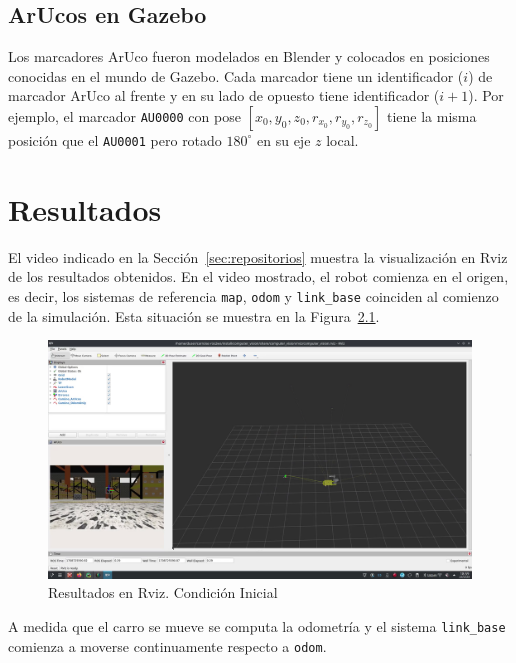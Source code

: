 \documentclass[12pt, a4paper]{report}
\begin{document}
			\section{ArUcos en Gazebo}
				Los marcadores ArUco fueron modelados en Blender y colocados en posiciones conocidas en el mundo de Gazebo.
				Cada marcador tiene un identificador ($i$) de marcador ArUco al frente y en su lado de opuesto tiene identificador ($i+1$). Por ejemplo, el marcador \texttt{AU0000} con pose $[x_0, y_0, z_0, r_x_0, r_y_0, r_z_0]$ tiene la misma posición que el \texttt{AU0001} pero rotado $180^{\circ}$ en su eje $z$ local.


	\chapter{Resultados}\label{ch:resultados}
		El video indicado en la Sección~\ref{sec:repositorios} muestra la visualización en Rviz de los resultados obtenidos.
		En el video mostrado, el robot comienza en el origen, es decir, los sistemas de referencia \texttt{map}, \texttt{odom} y \texttt{link\_base} coinciden al comienzo de la simulación.
		Esta situación se muestra en la Figura~\ref{fig:resultados-condicion_inicial}.

		\begin{figure}[H]
			\centering
			\includegraphics[width=1\linewidth]{img/vlcsnap-2024-02-28-10h36m58s557}
			\caption{Resultados en Rviz. Condición Inicial}
			\label{fig:resultados-condicion_inicial}
		\end{figure}

		A medida que el carro se mueve se computa la odometría y el sistema \texttt{link\_base} comienza a moverse continuamente respecto a \texttt{odom}.
\end{document}
